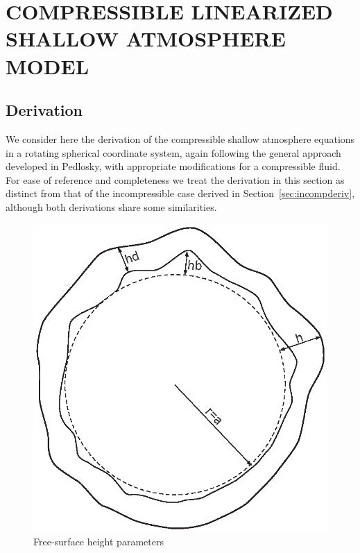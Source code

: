 
\chapter[COMPRESSIBLE LINEARIZED SHALLOW ATMOSPHERE\\ MODEL]{COMPRESSIBLE LINEARIZED SHALLOW ATMOSPHERE\\ MODEL}
\label{chap:4}
\section{Derivation}
We consider here the derivation of the compressible shallow atmosphere equations in a rotating spherical coordinate system, again following the general approach developed in Pedlosky\cite{Pedlosky:GFD}, with appropriate modifications for a compressible fluid. For ease of reference and completeness we treat the derivation in this section as distinct from that of the incompressible case derived in Section~\ref{sec:incompderiv}, although both derivations share some similarities.
\begin{figure}[htbp]
	\centering
		\includegraphics[scale=0.65]{IMAGES/freesurfparams.eps}
	\caption{Free-surface height parameters}
	\label{fig:freesurfparams1}
\end{figure}


